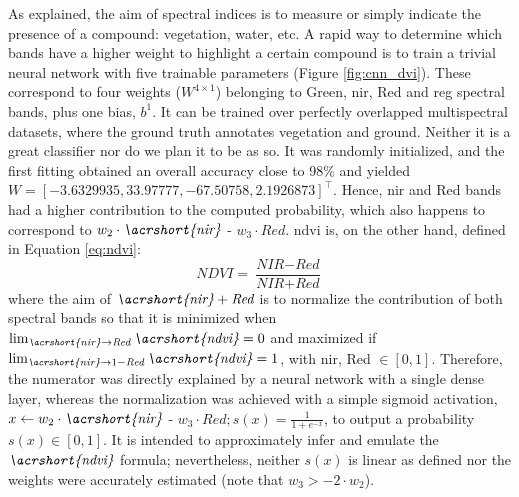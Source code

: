 \begin{kaobox}[frametitle=Activation of relevant spectral bands]
As explained, the aim of spectral indices is to measure or simply indicate the presence of a compound: vegetation, water, etc. A rapid way to determine which bands have a higher weight to highlight a certain compound is to train a trivial neural network with five trainable parameters (Figure \ref{fig:cnn_dvi}). These correspond to four weights ($W^{4\times1}$) belonging to Green, \acrshort{nir}, Red and \acrshort{reg} spectral bands, plus one bias, $b^{1}$. It can be trained over perfectly overlapped multispectral datasets, where the ground truth annotates vegetation and ground. Neither it is a great classifier nor do we plan it to be as so. It was randomly initialized, and the first fitting obtained an overall accuracy close to 98\% and yielded $W = \left[-3.6329935, 33.97777, -67.50758, 2.1926873\right]^{\intercal}$. Hence, \acrshort{nir} and Red bands had a higher contribution to the computed probability, which also happens to correspond to $w_2 \cdot \textit{\acrshort{nir}}$ - $w_3 \cdot \textit{Red}$. \acrshort{ndvi} is, on the other hand, defined in Equation \ref{eq:ndvi}:
\begin{equation}
    \textit{NDVI} = \frac{\textit{NIR} - \textit{Red}}{\textit{NIR} + \textit{Red}}
    \label{eq:ndvi}
\end{equation}
where the aim of $\textit{\acrshort{nir}} + \textit{Red}$ is to normalize the contribution of both spectral bands so that it is minimized when $\lim_{\textit{\acrshort{nir}} \to \textit{Red}} \textit{\acrshort{ndvi}} = 0$ and maximized if $\lim_{\textit{\acrshort{nir}} \to 1 - \textit{Red}} \textit{\acrshort{ndvi}} = 1$, with \acrshort{nir}, Red $\in [0, 1]$. Therefore, the numerator was directly explained by a neural network with a single dense layer, whereas the normalization was achieved with a simple sigmoid activation, $x \gets w_2 \cdot \textit{\acrshort{nir}}$ - $w_3 \cdot \textit{Red}; s(x) =  \frac{1}{1 + e^{-x}}$, to output a probability $s(x) \in [0, 1]$. It is intended to approximately infer and emulate the $\textit{\acrshort{ndvi}}$ formula; nevertheless, neither $s(x)$ is linear as defined nor the weights were accurately estimated (note that $w_3 > -2 \cdot w_2$).  
\end{kaobox}

